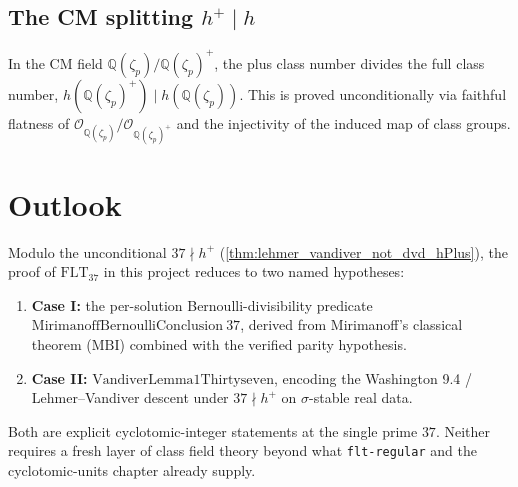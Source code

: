 \subsection*{The CM splitting $h^+ \mid h$}

\begin{theorem}
  \label{thm:hPlus_dvd_h}
  \leanok
  In the CM field $\mathbb Q(\zeta_p)/\mathbb Q(\zeta_p)^+$, the plus
  class number divides the full class number,
  $h(\mathbb Q(\zeta_p)^+) \mid h(\mathbb Q(\zeta_p))$.  This is
  proved unconditionally via faithful flatness of
  $\mathcal O_{\mathbb Q(\zeta_p)}/\mathcal O_{\mathbb Q(\zeta_p)^+}$
  and the injectivity of the induced map of class groups.
\end{theorem}

\section{Outlook}

Modulo the unconditional $37 \nmid h^+$
(\cref{thm:lehmer_vandiver_not_dvd_hPlus}), the proof of
$\mathrm{FLT}_{37}$ in this project reduces to two named hypotheses:

\begin{enumerate}
  \item \textbf{Case I:} the per-solution Bernoulli-divisibility
  predicate $\mathrm{MirimanoffBernoulliConclusion}\ 37$, derived
  from Mirimanoff's classical theorem ($\mathrm{MBI}$) combined with the
  verified parity hypothesis.
  \item \textbf{Case II:} $\mathrm{VandiverLemma1Thirtyseven}$, encoding
  the Washington 9.4 / Lehmer--Vandiver descent under $37 \nmid h^+$ on
  $\sigma$-stable real data.
\end{enumerate}

Both are explicit cyclotomic-integer statements at the single prime
$37$.  Neither requires a fresh layer of class field theory beyond what
\texttt{flt-regular} and the cyclotomic-units chapter already supply.
